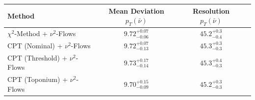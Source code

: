     \begin{tabular}{lccc}
        \toprule
        Method & Mean Deviation $p_{T}(\bar{\nu})$ & Resolution $p_{T}(\bar{\nu})$ \\
        \midrule
        $\chi^2$-Method + $\nu^2$-Flows & $9.72^{+0.07}_{-0.06}$ & $45.2^{+0.3}_{-0.4}$ \\
        CPT (Nominal) + $\nu^2$-Flows & $9.72^{+0.07}_{-0.13}$ & $45.3^{+0.3}_{-0.3}$ \\
        CPT (Threshold) + $\nu^2$-Flows & $9.73^{+0.17}_{-0.14}$ & $45.3^{+0.4}_{-0.3}$ \\
        CPT (Toponium) + $\nu^2$-Flows & $9.70^{+0.15}_{-0.09}$ & $45.2^{+0.3}_{-0.3}$ \\
        \bottomrule
    \end{tabular}